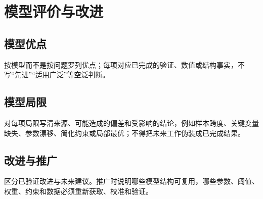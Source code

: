 \section{模型评价与改进}

\subsection{模型优点}

按模型而不是按问题罗列优点；每项对应已完成的验证、数值或结构事实，不写“先进”“适用广泛”等空泛判断。

\subsection{模型局限}

对每项局限写清来源、可能造成的偏差和受影响的结论，例如样本跨度、关键变量缺失、参数漂移、简化约束或局部最优；不得把未来工作伪装成已完成结果。

\subsection{改进与推广}

区分已验证改进与未来建议。推广时说明哪些模型结构可复用，哪些参数、阈值、权重、约束和数据必须重新获取、校准和验证。
